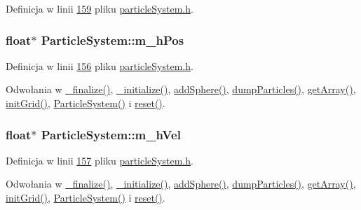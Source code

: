 Definicja w linii \hyperlink{particle_system_8h_source_l00159}{159} pliku \hyperlink{particle_system_8h_source}{particle\-System.\-h}.

\hypertarget{class_particle_system_ab9d75471d2eaaeb8fa98d2f3f47d9c25}{
\subsubsection[{m\-\_\-h\-Pos}]{\setlength{\rightskip}{0pt plus 5cm}float$\ast$ Particle\-System\-::m\-\_\-h\-Pos\hspace{0.3cm}{\ttfamily [protected]}}}\label{class_particle_system_ab9d75471d2eaaeb8fa98d2f3f47d9c25}


Definicja w linii \hyperlink{particle_system_8h_source_l00156}{156} pliku \hyperlink{particle_system_8h_source}{particle\-System.\-h}.



Odwołania w \hyperlink{particle_system_8cpp_source_l00205}{\-\_\-finalize()}, \hyperlink{particle_system_8cpp_source_l00123}{\-\_\-initialize()}, \hyperlink{particle_system_8cpp_source_l00485}{add\-Sphere()}, \hyperlink{particle_system_8cpp_source_l00331}{dump\-Particles()}, \hyperlink{particle_system_8cpp_source_l00346}{get\-Array()}, \hyperlink{particle_system_8cpp_source_l00406}{init\-Grid()}, \hyperlink{particle_system_8cpp_source_l00033}{Particle\-System()} i \hyperlink{particle_system_8cpp_source_l00436}{reset()}.

\hypertarget{class_particle_system_a20560c896ee8a8bbc827a8e5902da7e2}{
\subsubsection[{m\-\_\-h\-Vel}]{\setlength{\rightskip}{0pt plus 5cm}float$\ast$ Particle\-System\-::m\-\_\-h\-Vel\hspace{0.3cm}{\ttfamily [protected]}}}\label{class_particle_system_a20560c896ee8a8bbc827a8e5902da7e2}


Definicja w linii \hyperlink{particle_system_8h_source_l00157}{157} pliku \hyperlink{particle_system_8h_source}{particle\-System.\-h}.



Odwołania w \hyperlink{particle_system_8cpp_source_l00205}{\-\_\-finalize()}, \hyperlink{particle_system_8cpp_source_l00123}{\-\_\-initialize()}, \hyperlink{particle_system_8cpp_source_l00485}{add\-Sphere()}, \hyperlink{particle_system_8cpp_source_l00331}{dump\-Particles()}, \hyperlink{particle_system_8cpp_source_l00346}{get\-Array()}, \hyperlink{particle_system_8cpp_source_l00406}{init\-Grid()}, \hyperlink{particle_system_8cpp_source_l00033}{Particle\-System()} i \hyperlink{particle_system_8cpp_source_l00436}{reset()}.

